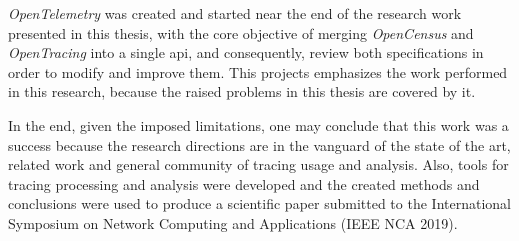 \emph{OpenTelemetry} was created and started near the end of the research work presented in this thesis, with the core objective of merging \emph{OpenCensus} and \emph{OpenTracing} into a single \gls{api}, and consequently, review both specifications in order to modify and improve them. This projects emphasizes the work performed in this research, because the raised problems in this thesis are covered by it.

In the end, given the imposed limitations, one may conclude that this work was a success because the research directions are in the vanguard of the state of the art, related work and general community of tracing usage and analysis. Also, tools for tracing processing and analysis were developed and the created methods and conclusions were used to produce a scientific paper submitted to the International Symposium on Network Computing and Applications (IEEE NCA 2019).

%
%
%
%
%
%
%
%
%

\checkoddpage
{}
{
    \newpage
    \blankpage
}
{
}